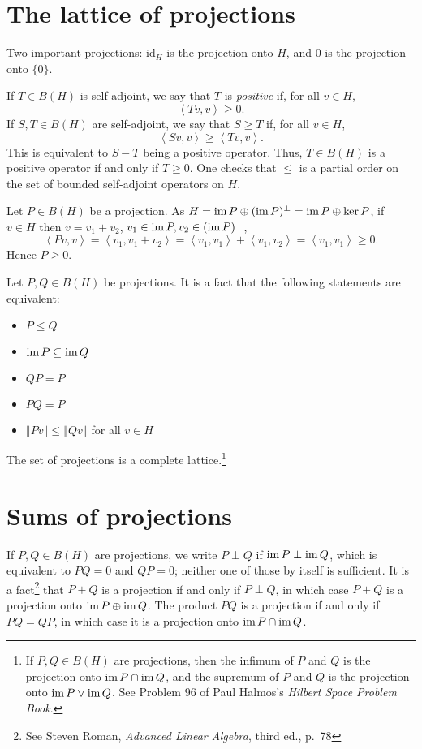 \documentclass{article}
\newcommand{\inner}[2]{\left\langle #1, #2 \right\rangle}
\newcommand{\im}{\textrm{im\,}}
\newcommand{\id}{\textrm{id}}
\newcommand{\norm}[1]{\left\Vert #1 \right\Vert}
\begin{document}
\section{The lattice of projections}
Two important projections: $\id_H$ is the projection onto $H$, and $0$ is the projection onto $\{0\}$. 


If $T \in B(H)$ is self-adjoint, we say that $T$ is  {\em positive}  if, for all $v \in H$,
\[
\inner{Tv}{v} \geq 0.
\]
If $S,T \in B(H)$ are self-adjoint, we say that $S \geq T$ if, for all $v \in H$,
\[
\inner{Sv}{v} \geq \inner{Tv}{v}.
\]
This is equivalent to $S-T$ being a positive operator. Thus, $T \in B(H)$ is a positive operator if and only if $T \geq 0$. 
One checks that $\leq$ is a partial order on the set of bounded self-adjoint operators on $H$. 


Let $P \in B(H)$ be a projection. As $H = \im P \oplus (\im P)^\perp=\im P \oplus \ker P$, if $v \in H$ then $v=v_1+v_2$, $v_1 \in \im P, v_2 \in (\im P)^\perp$,
\[
\inner{Pv}{v}=\inner{v_1}{v_1+v_2}=\inner{v_1}{v_1}+\inner{v_1}{v_2}=\inner{v_1}{v_1} \geq 0.
\]
Hence $P \geq 0$.

Let $P,Q \in B(H)$ be projections. It is a fact that the following statements are equivalent:
\begin{itemize}
\item $P \leq Q$
\item $\im P \subseteq \im Q$
\item $QP=P$
\item $PQ=P$
\item $\norm{Pv} \leq \norm{Qv}$ for all $v \in H$
\end{itemize}

The set of projections is a complete lattice.\footnote{If $P,Q \in B(H)$ are projections, then the infimum of $P$ and $Q$ is the projection onto
$\im P \cap \im Q$, and the supremum of $P$ and $Q$ is the projection onto $\im P \vee \im Q$.
See Problem 96 of  Paul Halmos's {\em Hilbert Space Problem Book}.}



\section{Sums of projections}
\label{sums}
If $P,Q \in B(H)$ are projections, we write $P \perp Q$ if $\im P \perp \im Q$, which is equivalent to $PQ=0$ and $QP=0$; neither one of those by itself is sufficient. It is a
fact\footnote{See Steven Roman,
{\em Advanced Linear Algebra}, third ed., p.~78} that $P+Q$ is a projection if and only if
$P \perp Q$, in which case $P+Q$ is a projection onto $\im P \oplus \im Q$. The product $PQ$ is a projection if and only if
$PQ=QP$, in which case it is a projection onto $\im P \cap \im Q$. 
\end{document}
